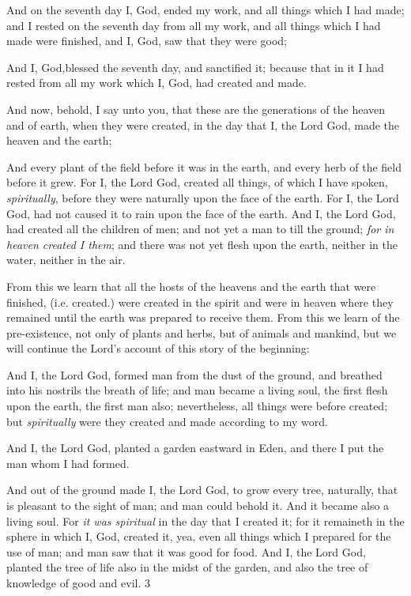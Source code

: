 And on the seventh day I, God, ended my work, and all things which I had made; and I rested
on the seventh day from all my work, and all things which I had made were finished, and I,
God, saw that they were good;

And I, God,blessed the seventh day, and sanctified it; because that in it I had rested from all
my work which I, God, had created and made.

And now, behold, I say unto you, that these are the generations of the heaven and of earth,
when they were created, in the day that I, the Lord God, made the heaven and the earth;

And every plant of the field before it was in the earth, and every herb of the field before it
grew. For I, the Lord God, created all things, of which I have spoken, \textit{spiritually}, before they
were naturally upon the face of the earth. For I, the Lord God, had not caused it to rain upon
the face of the earth. And I, the Lord God, had created all the children of men; and not yet a
man to till the ground; \textit{for in heaven created I them}; and there was not yet flesh upon the
earth, neither in the water, neither in the air.

From this we learn that all the hosts of the heavens and the earth that were finished, (i.e.
created.) were created in the spirit and were in heaven where they remained until the earth
was prepared to receive them. From this we learn of the pre-existence, not only of plants and
herbs, but of animals and mankind, but we will continue the Lord's account of this story of
the beginning:

And I, the Lord God, formed man from the dust of the ground, and breathed into his nostrils
the breath of life; and man became a living soul, the first flesh upon the earth, the first man
also; nevertheless, all things were before created; but \textit{spiritually} were they created and made
according to my word.

And I, the Lord God, planted a garden eastward in Eden, and there I put the man whom I had
formed.

And out of the ground made I, the Lord God, to grow every tree, naturally, that is pleasant to
the sight of man; and man could behold it. And it became also a living soul. For \textit{it was
spiritual} in the day that I created it; for it remaineth in the sphere in which I, God, created it,
yea, even all things which I prepared for the use of man; and man saw that it was good for
food. And I, the Lord God, planted the tree of life also in the midst of the garden, and also the
tree of knowledge of good and evil. 3

